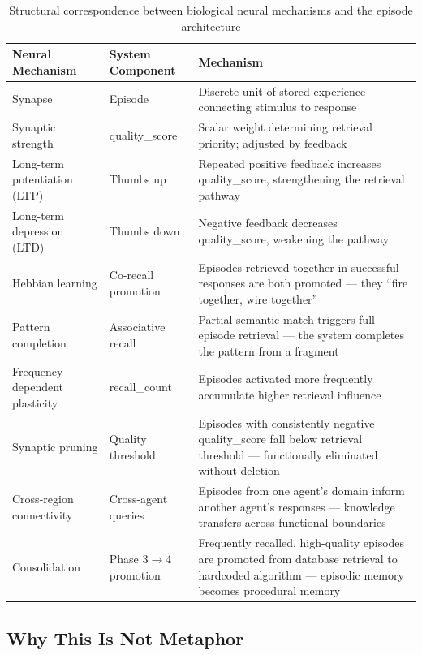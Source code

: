 \documentclass[11pt,a4paper]{article}
\begin{document}
\begin{table}[h]
\centering
\small
\begin{tabularx}{\textwidth}{>{\raggedright}p{3.5cm} >{\raggedright}p{3cm} >{\raggedright\arraybackslash}p{6.5cm}}
\toprule
\textbf{Neural Mechanism} & \textbf{System Component} & \textbf{Mechanism} \\
\midrule
Synapse & Episode & Discrete unit of stored experience connecting stimulus to response \\
\addlinespace
Synaptic strength & quality\_score & Scalar weight determining retrieval priority; adjusted by feedback \\
\addlinespace
Long-term potentiation (LTP) & Thumbs up & Repeated positive feedback increases quality\_score, strengthening the retrieval pathway \\
\addlinespace
Long-term depression (LTD) & Thumbs down & Negative feedback decreases quality\_score, weakening the pathway \\
\addlinespace
Hebbian learning & Co-recall promotion & Episodes retrieved together in successful responses are both promoted --- they ``fire together, wire together'' \\
\addlinespace
Pattern completion & Associative recall & Partial semantic match triggers full episode retrieval --- the system completes the pattern from a fragment \\
\addlinespace
Frequency-dependent plasticity & recall\_count & Episodes activated more frequently accumulate higher retrieval influence \\
\addlinespace
Synaptic pruning & Quality threshold & Episodes with consistently negative quality\_score fall below retrieval threshold --- functionally eliminated without deletion \\
\addlinespace
Cross-region connectivity & Cross-agent queries & Episodes from one agent's domain inform another agent's responses --- knowledge transfers across functional boundaries \\
\addlinespace
Consolidation & Phase 3$\rightarrow$4 promotion & Frequently recalled, high-quality episodes are promoted from database retrieval to hardcoded algorithm --- episodic memory becomes procedural memory \\
\bottomrule
\end{tabularx}
\caption{Structural correspondence between biological neural mechanisms and the episode architecture}
\end{table}

\subsection{Why This Is Not Metaphor}
\end{document}
